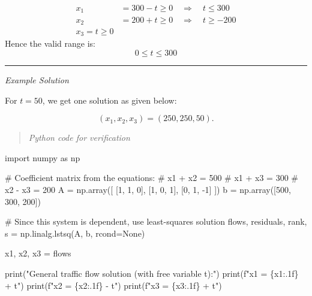 \documentclass[
  letterpaper,
  DIV=11,
  numbers=noendperiod]{scrreprt}
\newenvironment{Shaded}{\begin{snugshade}}{\end{snugshade}}
\newcommand{\BuiltInTok}[1]{\textcolor[rgb]{0.00,0.23,0.31}{#1}}
\newcommand{\CommentTok}[1]{\textcolor[rgb]{0.37,0.37,0.37}{#1}}
\newcommand{\DecValTok}[1]{\textcolor[rgb]{0.68,0.00,0.00}{#1}}
\newcommand{\ImportTok}[1]{\textcolor[rgb]{0.00,0.46,0.62}{#1}}
\newcommand{\NormalTok}[1]{\textcolor[rgb]{0.00,0.23,0.31}{#1}}
\newcommand{\OperatorTok}[1]{\textcolor[rgb]{0.37,0.37,0.37}{#1}}
\newcommand{\SpecialCharTok}[1]{\textcolor[rgb]{0.37,0.37,0.37}{#1}}
\newcommand{\SpecialStringTok}[1]{\textcolor[rgb]{0.13,0.47,0.30}{#1}}
\newcommand{\StringTok}[1]{\textcolor[rgb]{0.13,0.47,0.30}{#1}}
\newcommand{\VariableTok}[1]{\textcolor[rgb]{0.07,0.07,0.07}{#1}}
\begin{document}
\[
\begin{align*}
x_1 &= 300 - t \geq 0 \quad \Rightarrow \quad t \leq 300\\
x_2 &= 200 + t \geq 0 \quad \Rightarrow \quad t \geq -200\\
x_3 = t \geq 0
\end{align*}
\] Hence the valid range is: \[
0 \leq t \leq 300
\]

\begin{center}\rule{0.5\linewidth}{0.5pt}\end{center}

\emph{Example Solution}

For \(t = 50\), we get one solution as given below:

\[
(x_1, x_2, x_3) = (250, 250, 50).
\]

\begin{quote}
\emph{Python code for verification}
\end{quote}

\label{solve-traffic}
\begin{Shaded}
\begin{Highlighting}[]
\ImportTok{import}\NormalTok{ numpy }\ImportTok{as}\NormalTok{ np}

\CommentTok{\# Coefficient matrix from the equations:}
\CommentTok{\# x1 + x2      = 500}
\CommentTok{\# x1     + x3  = 300}
\CommentTok{\#      x2 {-} x3 = 200}
\NormalTok{A }\OperatorTok{=}\NormalTok{ np.array([}
\NormalTok{    [}\DecValTok{1}\NormalTok{, }\DecValTok{1}\NormalTok{, }\DecValTok{0}\NormalTok{],}
\NormalTok{    [}\DecValTok{1}\NormalTok{, }\DecValTok{0}\NormalTok{, }\DecValTok{1}\NormalTok{],}
\NormalTok{    [}\DecValTok{0}\NormalTok{, }\DecValTok{1}\NormalTok{, }\OperatorTok{{-}}\DecValTok{1}\NormalTok{]}
\NormalTok{])}
\NormalTok{b }\OperatorTok{=}\NormalTok{ np.array([}\DecValTok{500}\NormalTok{, }\DecValTok{300}\NormalTok{, }\DecValTok{200}\NormalTok{])}

\CommentTok{\# Since this system is dependent, use least{-}squares solution}
\NormalTok{flows, residuals, rank, s }\OperatorTok{=}\NormalTok{ np.linalg.lstsq(A, b, rcond}\OperatorTok{=}\VariableTok{None}\NormalTok{)}

\NormalTok{x1, x2, x3 }\OperatorTok{=}\NormalTok{ flows}

\BuiltInTok{print}\NormalTok{(}\StringTok{"General traffic flow solution (with free variable t):"}\NormalTok{)}
\BuiltInTok{print}\NormalTok{(}\SpecialStringTok{f"x1 = }\SpecialCharTok{\{}\NormalTok{x1}\SpecialCharTok{:.1f\}}\SpecialStringTok{ + t"}\NormalTok{)}
\BuiltInTok{print}\NormalTok{(}\SpecialStringTok{f"x2 = }\SpecialCharTok{\{}\NormalTok{x2}\SpecialCharTok{:.1f\}}\SpecialStringTok{ {-} t"}\NormalTok{)}
\BuiltInTok{print}\NormalTok{(}\SpecialStringTok{f"x3 = }\SpecialCharTok{\{}\NormalTok{x3}\SpecialCharTok{:.1f\}}\SpecialStringTok{ + t"}\NormalTok{)}
\end{Highlighting}
\end{Shaded}
\end{document}
